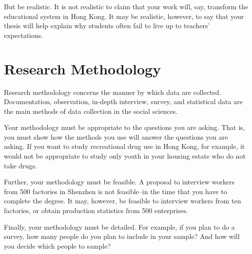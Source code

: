 \documentclass[draftclsnofoot,journal,onecolumn,12pt]{IEEEtran}
\begin{document}
But be realistic. It is not realistic to claim that your work will, say, transform the educational system in Hong
Kong. It may be realistic, however, to say that your thesis will help explain why students often fail to live up to
teachers' expectations.

\section{Research Methodology}
Research methodology concerns the manner by which data are collected. Documentation, observation, in-depth
interview, survey, and statistical data are the main methods of data collection in the social sciences.

Your methodology must be  appropriate  to the questions you are asking. That is, you must show how the
methods you use will answer the questions you are asking. If you want to study recreational drug use in Hong
Kong, for example, it would not be appropriate to study only youth in your housing estate who do not take drugs.

Further, your methodology must be feasible. A proposal to interview workers from 500 factories in Shenzhen is
not feasible--in the time that you have to complete the degree. It may, however, be feasible to interview workers
from ten factories, or obtain production statistics from 500 enterprises.

Finally, your methodology must be detailed. For example, if you plan to do a survey, how many people do you
plan to include in your sample? And how will you decide which people to sample?
%
\nocite{*}

\renewcommand\refname{References}


\end{document}
